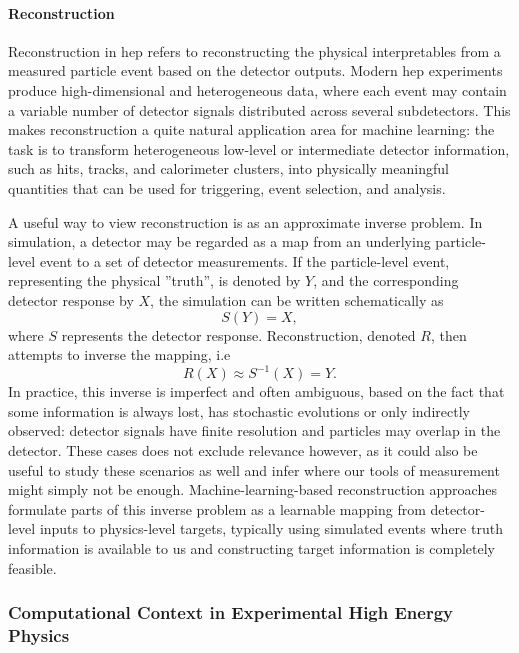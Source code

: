 \paragraph{Reconstruction} Reconstruction in \gls{hep} refers to reconstructing the physical interpretables from a measured particle event based on the detector outputs.  Modern \gls{hep} experiments produce high-dimensional and heterogeneous data, where each event may contain a variable number of detector signals distributed across several subdetectors. This makes reconstruction a quite natural application area for machine learning: the task is to transform heterogeneous low-level or intermediate detector information, such as hits, tracks, and calorimeter clusters, into physically meaningful quantities that can be used for triggering, event selection, and analysis.



A useful way to view reconstruction is as an approximate inverse problem. In simulation, a detector may be regarded as a map from an underlying particle-level event to a set of detector measurements. If the particle-level event, representing the physical ''truth'', is denoted by \(Y\), and the corresponding detector response by \(X\), the simulation can be written schematically as
\begin{equation}
    S(Y) = X ,
\end{equation}
where \(S\) represents the detector response. Reconstruction, denoted $R$,  then attempts to inverse the mapping, i.e
\begin{equation}
    R(X) \approx S^{-1}(X) = Y .
\end{equation}
In practice, this inverse is imperfect and often ambiguous, based on the fact that some information is always lost, has stochastic evolutions or only indirectly observed: detector signals have finite resolution and particles may overlap in the detector. These cases does not exclude relevance however, as it could also be useful to study these scenarios as well and infer where our tools of measurement might simply not be enough. Machine-learning-based reconstruction approaches formulate parts of this inverse problem as a learnable mapping from detector-level inputs to physics-level targets, typically using simulated events where truth information is available to us and constructing target information is completely feasible.

\subsubsection{Computational Context in Experimental High Energy Physics}

